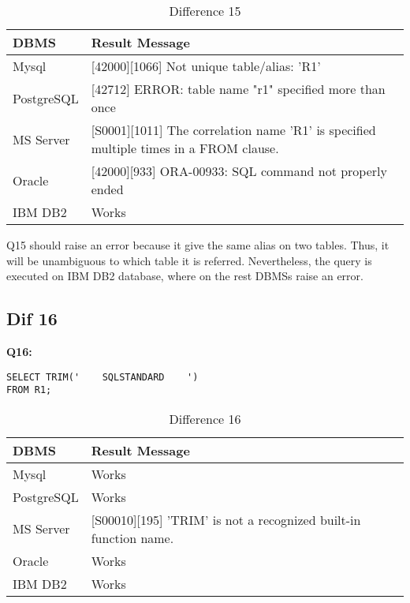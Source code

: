 \begin{table}[h]
\centering
\caption{Difference 15}
\label{my-label}
\begin{tabular}{|p{2cm}|p{11.5cm}| }
\hline
\textbf{DBMS} & \textbf{Result Message}                                                                       \\ \hline
Mysql         & {[}42000{]}{[}1066{]} Not unique table/alias: 'R1'                                            \\ \hline
PostgreSQL    & {[}42712{]} ERROR: table name "r1" specified more than once                                   \\ \hline
MS Server     & {[}S0001{]}{[}1011{]} The correlation name 'R1' is specified multiple times in a FROM clause. \\ \hline
Oracle        & {[}42000{]}{[}933{]} ORA-00933: SQL command not properly ended                                \\ \hline
IBM DB2       & Works                                                                                         \\ \hline
\end{tabular}
\end{table}

Q15 should raise an error because it give the same alias on two tables. Thus, it will be unambiguous to which table it is referred. Nevertheless, the query is executed on IBM DB2 database, where on the rest DBMSs raise an error. 


\subsection{Dif 16}

\textbf{Q16:}
\begin{mdframed}[backgroundcolor=lightgray!20]
\begin{lstlisting}[style=SQL]
SELECT TRIM('    SQLSTANDARD    ')
FROM R1;
\end{lstlisting}
\end{mdframed}

\begin{table}[h]
\centering
\caption{Difference 16}
\label{my-label}
\begin{tabular}{|p{2cm}|p{11.5cm}| }
\hline
\textbf{DBMS} & \textbf{Result Message}                                                  \\ \hline
Mysql         & Works                                                                    \\ \hline
PostgreSQL    & Works                                                                    \\ \hline
MS Server     & {[}S00010{]}{[}195{]} 'TRIM' is not a recognized built-in function name. \\ \hline
Oracle        & Works                                                                    \\ \hline
IBM DB2       & Works                                                                    \\ \hline
\end{tabular}
\end{table}

